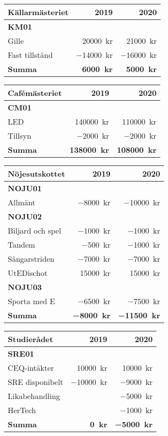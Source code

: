 \documentclass[../_main/handlingar.tex]{subfiles}
\begin{document}
\begin{tabularx}{10cm}{X r r}
    \textbf{\large Källarmästeriet} & \textbf{2019} & \textbf{2020} \\
    \hline
    \textbf{KM01} \\
    Gille & \SI{20000}{kr} & \SI{21000}{kr} \\
    Fast tillstånd & \SI{-14000}{kr} & \SI{-16000}{kr} \\
    \hline
    \textbf{Summa} & \textbf{\SI{6000}{kr}} & \textbf{\SI{5000}{kr}} \\
\end{tabularx}

\begin{tabularx}{10cm}{X r r}
    \textbf{\large Cafémästeriet} & \textbf{2019} & \textbf{2020} \\
    \hline
    \textbf{CM01} \\
    LED & \SI{140000}{kr} & \SI{110000}{kr} \\
    Tillsyn & \SI{-2000}{kr} & \SI{-2000}{kr} \\
    \hline
    \textbf{Summa} & \textbf{\SI{138000}{kr}} & \textbf{\SI{108000}{kr}} \\
\end{tabularx}

\begin{tabularx}{10cm}{X r r}
    \textbf{\large Nöjesutskottet} & \textbf{2019} & \textbf{2020} \\
    \hline
    \textbf{NOJU01} \\
    Allmänt & \SI{-8000}{kr} & \SI{-10000}{kr} \\
    \textbf{NOJU02} \\
    Biljard och spel & \SI{-1000}{kr} & \SI{-1000}{kr} \\
    Tandem & \SI{-500}{kr} & \SI{-1000}{kr} \\
    Sångarstriden & \SI{-7000}{kr} & \SI{-7000}{kr} \\
    UtEDischot & \SI{15000}{kr} & \SI{15000}{kr} \\
    \textbf{NOJU03} \\
    Sporta med E & \SI{-6500}{kr} & \SI{-7500}{kr} \\
    \hline
    \textbf{Summa} & \textbf{\SI{-8000}{kr}} & \textbf{\SI{-11500}{kr}} \\
\end{tabularx}

\begin{tabularx}{10cm}{X r r}
    \textbf{\large Studierådet} & \textbf{2019} & \textbf{2020} \\
    \hline
    \textbf{SRE01} \\
    CEQ-intäkter & \SI{10000}{kr} & \SI{10000}{kr} \\
    SRE disponibelt & \SI{-10000}{kr} & \SI{-9000}{kr} \\
    Likabehandling & & \SI{-5000}{kr} \\
    HerTech & & \SI{-1000}{kr} \\
    \hline
    \textbf{Summa} & \textbf{\SI{0}{kr}} & \textbf{\SI{-5000}{kr}} \\
\end{tabularx}
\end{document}
